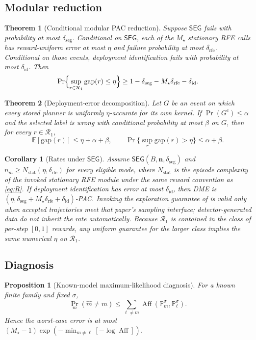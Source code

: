 \documentclass[11pt]{article}
\newtheorem{theorem}{Theorem}
\newtheorem{proposition}{Proposition}
\newtheorem{corollary}{Corollary}
\newcommand{\Rone}{\mathcal{R}_1}
\newcommand{\Aff}{\operatorname{Aff}}
\newcommand{\SEG}{\mathsf{SEG}}
\newcommand{\DME}{\textsc{DME}}
\newcommand{\E}{\mathbb{E}}
\newcommand{\Prb}{\Pr}
\newcommand{\deltaid}{\delta_{\mathrm{id}}}
\newcommand{\deltaseg}{\delta_{\mathrm{seg}}}
\newcommand{\deltarfe}{\delta_{\mathrm{rfe}}}
\begin{document}
\subsection{Modular reduction}

\begin{theorem}[Conditional modular PAC reduction]
\label{thm:modular}
Suppose $\SEG$ fails with probability at most $\deltaseg$. Conditional on
$\SEG$, each of the $M_\star$ stationary RFE calls has reward-uniform error at
most $\eta$ and failure probability at most $\deltarfe$. Conditional on those
events, deployment identification fails with probability at most $\deltaid$.
Then
\[
\Prb\Bigl\{\sup_{r\in\Rone}\mathrm{gap}(r)\le\eta\Bigr\}
\ge 1-\deltaseg-M_\star\deltarfe-\deltaid.
\]
\end{theorem}

\begin{theorem}[Deployment-error decomposition]
\label{thm:decomp}
Let $G$ be an event on which every stored planner is uniformly
$\eta$-accurate for its own kernel. If $\Prb(G^c)\le\alpha$ and the selected
label is wrong with conditional probability at most $\beta$ on $G$, then for
every $r\in\Rone$,
\[
\E[\mathrm{gap}(r)]\le\eta+\alpha+\beta,\qquad
\Prb\bigl\{\sup_r\mathrm{gap}(r)>\eta\bigr\}\le\alpha+\beta.
\]
\end{theorem}

\begin{corollary}[Rates under $\SEG$]
\label{cor:rate}
Assume $\SEG(B,\mathbf{n},\deltaseg)$ and $n_m\ge N_{\mathrm{stat}}(\eta,\deltarfe)$
for every eligible mode, where $N_{\mathrm{stat}}$ is the episode complexity of
the invoked stationary RFE module under the same reward convention as
\eqref{eq:R}. If deployment identification has error at most $\deltaid$, then
\DME{} is $(\eta,\deltaseg+M_\star\deltarfe+\deltaid)$-PAC. Invoking the
exploration guarantee of \citet{jin2020rewardfree} is valid only when accepted
trajectories meet that paper's sampling interface; detector-generated data do
not inherit the rate automatically. Because $\Rone$ is contained in the class
of per-step $[0,1]$ rewards, any uniform guarantee for the larger class
implies the same numerical $\eta$ on $\Rone$.
\end{corollary}

\subsection{Diagnosis}

\begin{proposition}[Known-model maximum-likelihood diagnosis]
\label{prop:aff}
For a known finite family and fixed $\sigma$,
\[
\Prb_m(\widehat m\neq m)
\le\sum_{\ell\neq m}\Aff(\mathbb{P}_m^\sigma,\mathbb{P}_\ell^\sigma).
\]
Hence the worst-case error is at most
$(M_\star-1)\exp(-\min_{m\neq\ell}[-\log\Aff])$.
\end{proposition}
\end{document}
